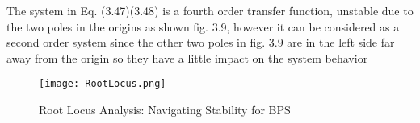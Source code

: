 The system in Eq. (3.47)(3.48) is a fourth order transfer function, unstable due to the two poles in the origins as shown fig. 3.9, however it can be considered as a second order system since the other two poles in fig. 3.9 are in the left side far away from the origin so they have a little impact on the system behavior

\begin{figure}[h]
    \centering
    \texttt{[image: RootLocus.png]}
    \caption{Root Locus Analysis: Navigating Stability for BPS}
\end{figure}

